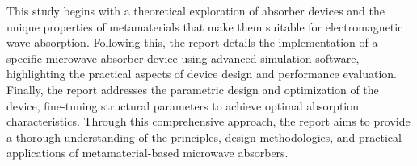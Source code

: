 \documentclass[12pt]{article}
\begin{document}
    This study begins with a theoretical exploration of absorber devices and the unique
    properties of metamaterials that make them suitable for electromagnetic wave absorption.
    Following this, the report details the implementation of a specific microwave absorber
    device using advanced simulation software, highlighting the practical aspects of device
    design and performance evaluation. Finally, the report addresses the parametric design and
    optimization of the device, fine-tuning structural parameters to achieve optimal absorption
    characteristics. Through this comprehensive approach, the report aims to provide a thorough
    understanding of the principles, design methodologies, and practical applications of
    metamaterial-based microwave absorbers.





\printbibliography
\end{document}
